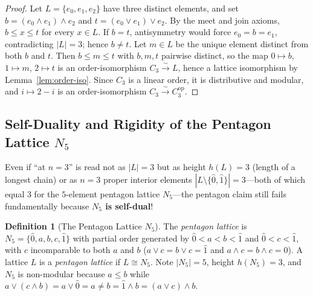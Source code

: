 \documentclass[11pt]{article}
\theoremstyle{definition}
\newtheorem{definition}[theorem]{Definition}
\newcommand{\op}{\mathrm{op}}
\begin{document}
\begin{proof}
Let $L = \{e_0, e_1, e_2\}$ have three distinct elements, and set
$b = (e_0 \wedge e_1) \wedge e_2$ and $t = (e_0 \vee e_1) \vee e_2$. By the meet
and join axioms, $b \le x \le t$ for every $x \in L$. If $b = t$, antisymmetry
would force $e_0 = b = e_1$, contradicting $|L| = 3$; hence $b \ne t$. Let
$m \in L$ be the unique element distinct from both $b$ and $t$. Then
$b \le m \le t$ with $b, m, t$ pairwise distinct, so the map $0 \mapsto b$,
$1 \mapsto m$, $2 \mapsto t$ is an order-isomorphism $C_3 \xrightarrow{\sim} L$,
hence a lattice isomorphism by Lemma~\ref{lem:order-iso}. Since $C_3$ is a
linear order, it is distributive and modular, and $i \mapsto 2 - i$ is an
order-isomorphism $C_3 \xrightarrow{\sim} C_3^{\op}$.
\end{proof}

\subsection{Self-Duality and Rigidity of the Pentagon Lattice \texorpdfstring{$N_5$}{N5}}

Even if ``at $n = 3$'' is read not as $|L| = 3$ but as height $h(L) = 3$ (length
of a longest chain) or as $n = 3$ proper interior elements $|L \setminus
\{\hat{0}, \hat{1}\}| = 3$---both of which equal $3$ for the $5$-element
pentagon lattice $N_5$---the pentagon claim still fails fundamentally because
\textbf{$N_5$ is self-dual}!

\begin{definition}[The Pentagon Lattice $N_5$]
\label{def:n5}
The \emph{pentagon lattice} is $N_5 = \{\hat{0}, a, b, c, \hat{1}\}$ with partial
order generated by $\hat{0} < a < b < \hat{1}$ and $\hat{0} < c < \hat{1}$, with
$c$ incomparable to both $a$ and $b$ ($a \vee c = b \vee c = \hat{1}$ and
$a \wedge c = b \wedge c = \hat{0}$). A lattice $L$ is a \emph{pentagon lattice}
if $L \cong N_5$. Note $|N_5| = 5$, height $h(N_5) = 3$, and $N_5$ is
non-modular because $a \le b$ while
$a \vee (c \wedge b) = a \vee \hat{0} = a \ne b = \hat{1} \wedge b = (a \vee c) \wedge b$.
\end{definition}
\end{document}
